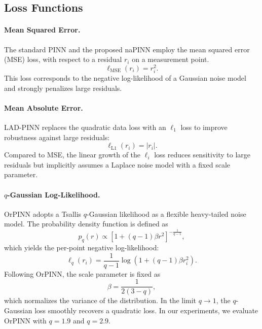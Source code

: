 \documentclass{article}
\theoremstyle{plain}
\theoremstyle{definition}
\theoremstyle{remark}
\begin{document}
\subsection{Loss Functions}
\paragraph{Mean Squared Error.} The standard PINN and the proposed naPINN employ the mean squared error (MSE) loss, with respect to a residual $r_i$ on a measurement point.
\begin{equation}
    \ell_\mathrm{MSE}(r_i) = r_i^2.
\end{equation}
This loss corresponds to the negative log-likelihood of a Gaussian noise model and strongly penalizes large residuals.

\paragraph{Mean Absolute Error.} LAD-PINN replaces the quadratic data loss with an $\ell_1$ loss to improve robustness against large residuals:
\begin{equation}
    \ell_\mathrm{L1}(r_i) = |r_i|.
\end{equation}
Compared to MSE, the linear growth of the $\ell_i$ loss reduces sensitivity to large residuals but implicitly assumes a Laplace noise model with a fixed scale parameter.

\paragraph{$q$-Gaussian Log-Likelihood.} OrPINN adopts a Tsallis $q$-Gaussian likelihood as a flexible heavy-tailed noise model. The probability density function is defined as
\begin{equation}
    p_q(r) \propto [1+(q-1) \beta r^2]^{-\frac{1}{q-1}},
\end{equation}
which yields the per-point negative log-likelihood:
\begin{equation}
    \ell_q(r_i) = \frac{1}{q-1} \log (1+(q-1) \beta r_i^2).
\end{equation}
Following OrPINN, the scale parameter is fixed as
\begin{equation}
    \beta = \frac{1}{2(3-q)},
\end{equation}
which normalizes the variance of the distribution. In the limit $q \rightarrow 1$, the $q$-Gaussian loss smoothly recovers a quadratic loss. In our experiments, we evaluate OrPINN with $q=1.9$ and $q=2.9$.
\end{document}
